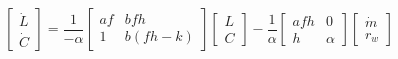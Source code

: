 \[
\left[
\begin{array}{c}
\dot{L} \\
\dot{C}
\end{array}
\right]
= \frac{1}{-\alpha}
\left[
\begin{array}{cc}
af & bfh \\
1 & b(fh-k)
\end{array}
\right]
\left[
\begin{array}{c}
L \\
C 
\end{array}
\right]
-\frac{1}{\alpha}
\left[
\begin{array}{cc}
afh & 0 \\
h & \alpha 
\end{array}
\right]
\left[
\begin{array}{c}
\dot{m} \\
r_w
\end{array}
\right]
\]
